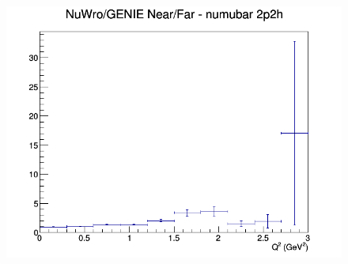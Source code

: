 \documentclass[12pt]{article}
\begin{document}
\begin{figure}[h]
\endminipage
{}
\includegraphics[width=\linewidth]{eff_Q2/LAr/ratios/2p2h_NuWro_GENIE_numubar_NF_Q2.png}
\endminipage
\newline
\end{figure}
\clearpage
\end{document}
